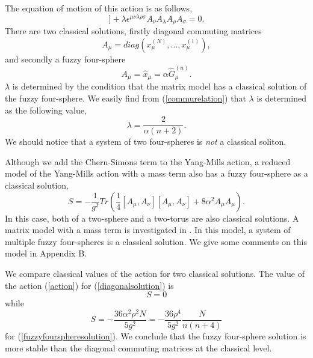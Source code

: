 \documentclass[a4paper,11pt]{article}
\begin{document}
The equation of motion of this action is as follows, 
\begin{equation} 
[A_{\nu},[A_{\mu},A_{\nu}]] 
+\lambda\epsilon^{\mu\nu\lambda\rho\sigma}
A_{\nu}A_{\lambda}A_{\rho}A_{\sigma}=0. 
\end{equation} 
There are two classical solutions, 
firstly diagonal commuting matrices 
\begin{equation} 
A_{\mu}=diag(x_{\mu}^{(N)},\ldots,x_{\mu}^{(1)}),  
\label{diagonalsolution}
\end{equation} 
and secondly a fuzzy four-sphere
\begin{equation} 
A_{\mu}=\hat{x}_{\mu}=\alpha\hat{G}_{\mu}^{(n)}.
\label{fuzzyfourspheresolution}
\end{equation} 
$\lambda$ is determined by the condition that 
the matrix model has a classical solution of the fuzzy four-sphere.  
We easily find from (\ref{commurelation}) that 
$\lambda$ is determined as the following value, 
\begin{equation} 
\lambda=\frac{2}{\alpha(n+2)}. 
\end{equation}
We should notice that  
a system of two four-spheres is {\sl not} a classical soliton.

Although we add the Chern-Simons term to the Yang-Mills action, 
a reduced model of the Yang-Mills action with a mass term also has 
a fuzzy four-sphere as a classical solution, 
\begin{equation}
S=-\frac{1}{g^{2}}Tr\left(
\frac{1}{4}[A_{\mu},A_{\nu}][A_{\mu},A_{\nu}]
+8\alpha^{2}A_{\mu}A_{\mu}
\right). 
\end{equation} 
In this case, 
both of a two-sphere and a two-torus are also classical solutions. 
A matrix model with a mass term is investigated in \cite{yk2}.
In this model, a system of multiple fuzzy four-spheres is a 
classical solution. 
We give some comments on this model in Appendix B. 

We compare classical values of the action for 
two classical solutions. 
The value of the action (\ref{action}) 
for (\ref{diagonalsolution}) is 
\begin{equation} 
S=0
\end{equation} 
while 
\begin{equation} 
S=-\frac{36\alpha^{2}\rho^{2}N}{5g^{2}}
=-\frac{36\rho^{4}}{5g^{2}}
\frac{N}{n(n+4)}
\end{equation} 
for (\ref{fuzzyfourspheresolution}). 
We conclude that 
the fuzzy four-sphere solution is more stable 
than the diagonal commuting matrices at the classical level. 
\end{document}
